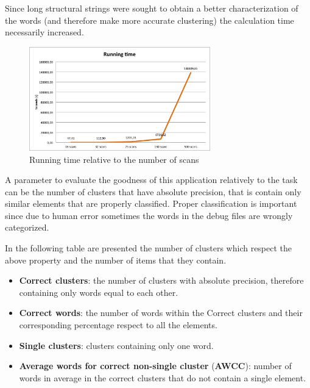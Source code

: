 Since long structural strings were sought to obtain a better characterization of the words (and therefore make more accurate clustering) the calculation time necessarily increased.

\begin{figure}[!htbp]
\centering
\includegraphics[width=0.7\textwidth]{images/esecuzione}
\caption{Running time relative to the number of scans}
\label{fig:time}
\end{figure}

A parameter to evaluate the goodness of this application relatively to the task can be the number of clusters that have absolute precision, that is contain only similar elements that are properly classified. Proper classification is important since due to human error sometimes the words in the debug files are wrongly categorized.

In the following table are presented the number of clusters which respect the above property and the number of items that they contain. 

\begin{itemize}

\item \textbf{Correct clusters}: the number of clusters with absolute precision, therefore containing only words equal to each other.
\item \textbf{Correct words}: the number of words within the Correct clusters and their corresponding percentage respect to all the elements.
\item \textbf{Single clusters}: clusters containing only one word.
\item \textbf{Average words for correct non-single cluster} (\textbf{AWCC}): number of words in average in the correct clusters that do not contain a single element.
\end{itemize}

